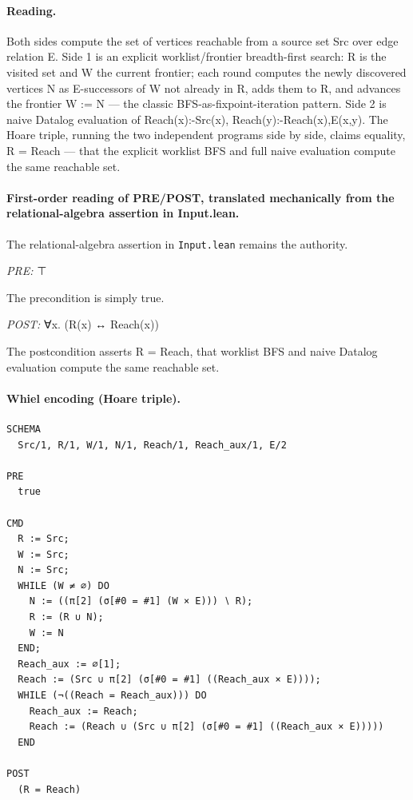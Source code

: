 \documentclass[10pt]{article}
\begin{document}
\paragraph{Reading.} Both sides compute the set of vertices reachable from a source set Src over edge relation E. Side 1 is an explicit worklist/frontier breadth-first search: R is the visited set and W the current frontier; each round computes the newly discovered vertices N as E-successors of W not already in R, adds them to R, and advances the frontier W := N --- the classic BFS-as-fixpoint-iteration pattern. Side 2 is naive Datalog evaluation of Reach(x):-Src(x), Reach(y):-Reach(x),E(x,y). The Hoare triple, running the two independent programs side by side, claims equality, R = Reach --- that the explicit worklist BFS and full naive evaluation compute the same reachable set.

\paragraph{First-order reading of PRE/POST, translated mechanically from the relational-algebra assertion in Input.lean.} The relational-algebra assertion in \texttt{Input.lean} remains the authority.

\textit{PRE:} ⊤\par The precondition is simply true.

\textit{POST:} ∀x. (R(x) ↔ Reach(x))\par The postcondition asserts R = Reach, that worklist BFS and naive Datalog evaluation compute the same reachable set.

\paragraph{Whiel encoding (Hoare triple).}

\begin{Verbatim}[fontsize=\scriptsize,breaklines=true,breakanywhere=true,frame=single,framesep=1.5mm]
SCHEMA
  Src/1, R/1, W/1, N/1, Reach/1, Reach_aux/1, E/2

PRE
  true 

CMD
  R := Src;
  W := Src;
  N := Src;
  WHILE (W ≠ ∅) DO
    N := ((π[2] (σ[#0 = #1] (W × E))) ∖ R);
    R := (R ∪ N);
    W := N
  END;
  Reach_aux := ∅[1];
  Reach := (Src ∪ π[2] (σ[#0 = #1] ((Reach_aux × E))));
  WHILE (¬((Reach = Reach_aux))) DO
    Reach_aux := Reach;
    Reach := (Reach ∪ (Src ∪ π[2] (σ[#0 = #1] ((Reach_aux × E)))))
  END

POST
  (R = Reach)
\end{Verbatim}
\end{document}
